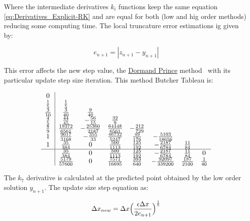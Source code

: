Where the intermediate derivatives \(k_i\) functions keep the same equation \ref{eq:Derivatives_Explicit-RK} and are equal for both (low and hig order methods) reducing some computing time. The local truncature error estimations ig given by:

\begin{equation}
    e_{n+1} = |z_{n+1} - y_{n+1}|
    \label{eq:Local_Truncature_Erro_Estimation_AdaptiveRK}
\end{equation}

This error affects the new step value, the \underline{Dormand Prince} method~\cite{kimura2009dormand} with its particular update step size iteration. This method Butcher Tableau is:

\begin{equation}
    \begin{array}{c|ccccccc}
        0\\
        \frac{1}{5} & \frac{1}{5}\\
        \frac{3}{10} & \frac{3}{40} & \frac{9}{40} \\
        \frac{4}{5} & \frac{44}{45} & -\frac{56}{15} & \frac{32}{9}\\
        \frac{8}{9} & \frac{19372}{6561} & -\frac{25360}{2187} & \frac{64448}{6561} & -\frac{212}{729}\\
        1 & \frac{9017}{3168} & -\frac{355}{33} & \frac{46732}{5247} & \frac{49}{176} & -\frac{5103}{18656}\\
        1 & \frac{35}{384} & 0 & \frac{500}{1113} & \frac{125}{192} & -\frac{2187}{6784} & \frac{11}{84}\\
        \hline
        & \frac{35}{384} & 0 & \frac{500}{1113} & \frac{125}{192} & -\frac{2187}{6784} & \frac{11}{84} & 0  \\
        & \frac{5179}{57600} & 0 & \frac{7571}{16695} & \frac{393}{640} & -\frac{92097}{339200} & \frac{187}{2100} & \frac{1}{40}  
    \end{array}
    \label{eq:Dormand-Prince_Tableu}
\end{equation}

The \(k_7\) derivative is calculated at the predicted point obtained by the low order solution \(y_{n+1}\). The update size step equation as:

\begin{equation}
    \Delta x_{new} = \Delta x \Bigl( \frac{\epsilon\Delta x}{2e_{n+1}}\Bigr)^{\frac{1}{5}}
    \label{eq:Update_Size_Step_Equation}
\end{equation}

